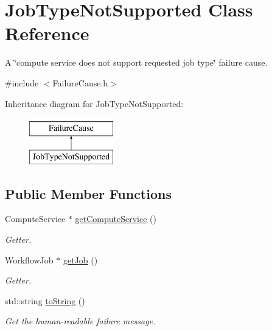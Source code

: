 \hypertarget{class_job_type_not_supported}{}\section{Job\+Type\+Not\+Supported Class Reference}
\label{class_job_type_not_supported}


A \char`\"{}compute service does not support requested job type\char`\"{} failure cause.  




{\ttfamily \#include $<$Failure\+Cause.\+h$>$}

Inheritance diagram for Job\+Type\+Not\+Supported\+:\begin{figure}[H]
\begin{center}
\leavevmode
\includegraphics[height=2.000000cm]{class_job_type_not_supported}
\end{center}
\end{figure}
\subsection*{Public Member Functions}
\begin{DoxyCompactItemize}
\item 
Compute\+Service $\ast$ \hyperlink{class_job_type_not_supported_adef77cd0b3a6bbb8d1c6a253c6ad581b}{get\+Compute\+Service} ()
\begin{DoxyCompactList}\small\item\em Getter. \end{DoxyCompactList}\item 
Workflow\+Job $\ast$ \hyperlink{class_job_type_not_supported_af05784134fac8f9a57ef4cbd3d740d38}{get\+Job} ()
\begin{DoxyCompactList}\small\item\em Getter. \end{DoxyCompactList}\item 
std\+::string \hyperlink{class_job_type_not_supported_ae9b87c93a2e6d509725ad7faf5357fc4}{to\+String} ()
\begin{DoxyCompactList}\small\item\em Get the human-\/readable failure message. \end{DoxyCompactList}\end{DoxyCompactItemize}


